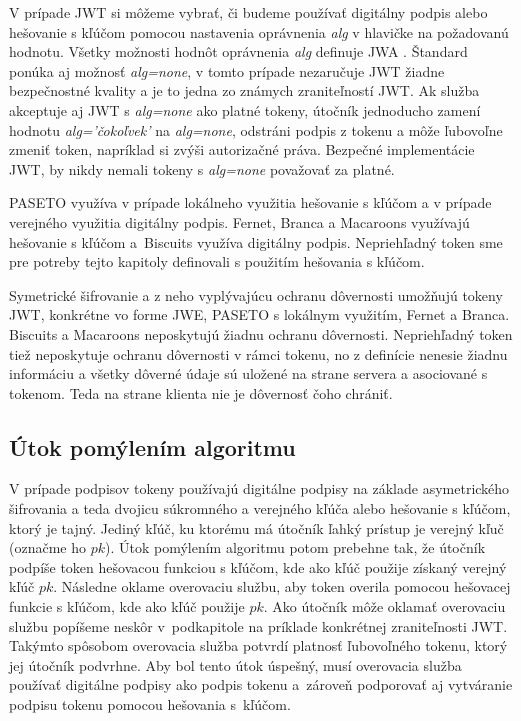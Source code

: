 V prípade JWT si môžeme vybrať, či budeme používať digitálny podpis alebo hešovanie s kľúčom pomocou nastavenia oprávnenia \textit{alg} v hlavičke na požadovanú hodnotu. Všetky možnosti hodnôt oprávnenia \textit{alg} definuje  JWA \cite{jwa_rfc}. Štandard ponúka aj možnosť \textit{alg=none}, v tomto prípade nezaručuje JWT žiadne bezpečnostné kvality a je to jedna zo známych zraniteľností \cite{jwt_vul} JWT. Ak služba akceptuje aj JWT s \textit{alg=none} ako platné tokeny, útočník jednoducho zamení hodnotu \textit{alg='čokoľvek'} na \textit{alg=none}, odstráni podpis z tokenu a môže ľubovoľne zmeniť token, napríklad si zvýši autorizačné práva. Bezpečné implementácie JWT, by nikdy nemali tokeny s \textit{alg=none} považovať za platné.

PASETO využíva v prípade lokálneho využitia hešovanie s kľúčom a v prípade verejného využitia digitálny podpis. Fernet, Branca a Macaroons využívajú hešovanie s kľúčom a~Biscuits využíva digitálny podpis. Nepriehľadný token sme pre potreby tejto kapitoly definovali s použitím hešovania s kľúčom.

Symetrické šifrovanie a z neho vyplývajúcu ochranu dôvernosti umožňujú tokeny JWT, konkrétne vo forme JWE, PASETO s lokálnym využitím, Fernet a Branca. Biscuits a Macaroons neposkytujú žiadnu ochranu dôvernosti. Nepriehľadný token tiež neposkytuje ochranu dôvernosti v rámci tokenu, no z definície nenesie žiadnu informáciu a všetky dôverné údaje sú uložené na strane servera a asociované s tokenom. Teda na strane klienta nie je dôvernosť čoho chrániť.

\subsection{Útok pomýlením algoritmu}

V prípade podpisov tokeny používajú digitálne podpisy na základe asymetrického šifrovania a teda dvojicu súkromného a verejného kľúča alebo hešovanie s kľúčom, ktorý je tajný. Jediný kľúč, ku ktorému má útočník ľahký prístup je verejný kľuč (označme ho $pk$). Útok pomýlením algoritmu potom prebehne tak, že útočník podpíše token hešovacou funkciou s kľúčom, kde ako kľúč použije získaný verejný kľúč $pk$. Následne oklame overovaciu službu, aby token overila pomocou hešovacej funkcie s kľúčom, kde ako kľúč použije $pk$. Ako útočník môže oklamať overovaciu službu popíšeme neskôr v~podkapitole na príklade konkrétnej zraniteľnosti JWT. Takýmto spôsobom overovacia služba potvrdí platnosť ľubovoľného tokenu, ktorý jej útočník podvrhne. Aby bol tento útok úspešný, musí overovacia služba používať digitálne podpisy ako podpis tokenu a~zároveň podporovať aj vytváranie podpisu tokenu pomocou hešovania s~kľúčom.

